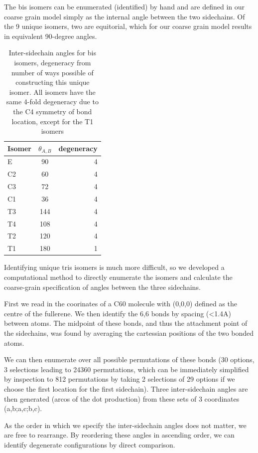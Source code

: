 \documentclass[journal=nanofd,manuscript=suppinfo]{achemso}
\begin{document}
The bis isomers can be enumerated (identified) by hand and are defined in our
coarse grain model simply as the internal angle between the two sidechains. Of
the 9 unique isomers, two are equitorial, which for our coarse grain model
results in equivalent 90-degree angles.

\begin{table}[ht!]
    \begin{tabular}{lcr}
\toprule
Isomer & $\theta_{A,B}$ & degeneracy \\
\midrule
E & 90 & 4  \\
C2 & 60 & 4  \\
C3 & 72 & 4  \\
C1 & 36 & 4  \\
T3 & 144 & 4  \\
T4 &108 & 4  \\
T2 & 120 & 4  \\
T1 & 180 & 1  
\end{tabular}
\caption{\label{table-bis}Inter-sidechain angles for bis isomers, degeneracy from number of ways possible of constructing this unique isomer. All isomers have the same 4-fold degeneracy due to the C4 symmetry of bond location, except for the T1 isomers }
\end{table}


Identifying unique tris isomers is much more difficult, so we developed
a computational method to directly enumerate the isomers and calculate the
coarse-grain specification of angles between the three sidechains.

First we read in the coorinates of a C60 molecule with (0,0,0) defined as the
centre of the fullerene. We then identify the 6,6 bonds by spacing (<1.4A)
between atoms.
The midpoint of these bonds, and thus the attachment point of the sidechains,
was found by averaging the cartessian positions of the two bonded atoms.

We can then enumerate over all possible permutations of these bonds (30
options, 3 selections leading to 24360 permutations, which can be immediately
simplified by inspection to 812 permutations by taking 2 selections of 29
options if we choose the first location for the first sidechain).
Three inter-sidechain angles are then generated (arcos of the dot production)
from these sets of 3 coordinates (a,b;a,c;b,c).

As the order in which we specify the inter-sidechain angles does not matter, we
are free to rearrange.
By reordering these angles in ascending order, we can identify degenerate
configurations by direct comparison.
\end{document}
